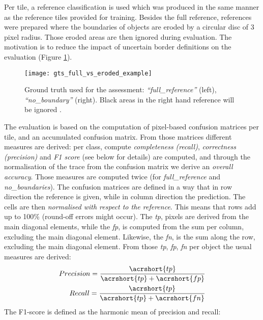 Per tile, a reference classification is used which was produced in the same
manner as the reference tiles provided for training. Besides the full
reference, references were prepared where the boundaries of objects are
eroded by a circular disc of 3 pixel radius. Those eroded areas are then
ignored during evaluation. The motivation is to reduce the impact of uncertain
border definitions on the evaluation (Figure
\ref{fig:gts_full_vs_eroded_example}).
\begin{figure}[h]
    \centering
    \texttt{[image: gts\_full\_vs\_eroded\_example]}
    \caption{
    Ground truth used for the assessment: \emph{``full\_reference''} (left),
    \emph{``no\_boundary''} (right). Black areas in the right hand reference
    will be ignored \cite{isprs_semantic}.
    }
    \label{fig:gts_full_vs_eroded_example}
\end{figure}
The evaluation is based on the computation of pixel-based confusion matrices
per tile, and an accumulated confusion matrix. From those matrices different
measures are derived: per class, compute \emph{completeness} \emph{(recall)},
\emph{correctness} \emph{(precision)} and \emph{F1 score} (see below for
details) are computed, and through the normalisation of the trace from the
confusion matrix we derive an \emph{overall accuracy}. Those measures are
computed twice (for \emph{full\_reference} and \emph{no\_boundaries}).
The confusion matrices are defined in a way that in row direction the reference
is given, while in column direction the prediction. The cells are then
\emph{normalised with respect to the reference}. This means that rows add up to
100\% (round-off errors might occur). The \emph{\acrfull{tp}},
pixels are derived from the main diagonal elements, while the
\emph{\acrfull{fp}},
is computed from the sum per column, excluding the main
diagonal element. Likewise, the \emph{\acrfull{fn}}, is the sum
along the row, excluding the main diagonal element. From those
\emph{\acrshort{tp}}, \emph{\acrshort{fp}}, \emph{\acrshort{fn}}
per object the usual measures are derived:
\begin{align*}
    Precision = \frac{\acrshort{tp}}{\acrshort{tp} + \acrshort{fp}} \\
    Recall = \frac{\acrshort{tp}}{\acrshort{tp} + \acrshort{fn}}
\end{align*}
The F1-score is defined as the harmonic mean of precision and recall:
